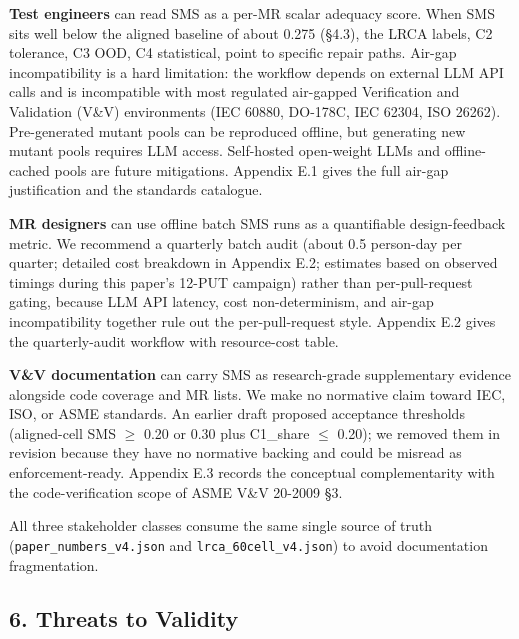 \documentclass[review,12pt,authoryear]{elsarticle}
\begin{document}
\textbf{Test engineers} can read SMS as a per-MR scalar adequacy score.
When SMS sits well below the aligned baseline of about 0.275 (§4.3), the
LRCA labels, C2 tolerance, C3 OOD, C4 statistical, point to specific
repair paths. Air-gap incompatibility is a hard limitation: the workflow
depends on external LLM API calls and is incompatible with most
regulated air-gapped Verification and Validation (V\&V) environments
(IEC 60880, DO-178C, IEC 62304, ISO 26262). Pre-generated mutant pools
can be reproduced offline, but generating new mutant pools requires LLM
access. Self-hosted open-weight LLMs and offline-cached pools are future
mitigations. Appendix E.1 gives the full air-gap justification and the
standards catalogue.

\textbf{MR designers} can use offline batch SMS runs as a quantifiable
design-feedback metric. We recommend a quarterly batch audit (about 0.5
person-day per quarter; detailed cost breakdown in Appendix E.2;
estimates based on observed timings during this paper's 12-PUT campaign)
rather than per-pull-request gating, because LLM API latency, cost
non-determinism, and air-gap incompatibility together rule out the
per-pull-request style. Appendix E.2 gives the quarterly-audit workflow
with resource-cost table.

\textbf{V\&V documentation} can carry SMS as research-grade
supplementary evidence alongside code coverage and MR lists. We make no
normative claim toward IEC, ISO, or ASME standards. An earlier draft
proposed acceptance thresholds (aligned-cell SMS $\geq$ 0.20 or 0.30 plus
C1\_share $\leq$ 0.20); we removed them in revision because they have no
normative backing and could be misread as enforcement-ready. Appendix
E.3 records the conceptual complementarity with the code-verification
scope of ASME V\&V 20-2009 §3.

All three stakeholder classes consume the same single source of truth
(\texttt{paper\_numbers\_v4.json} and \texttt{lrca\_60cell\_v4.json}) to
avoid documentation fragmentation.


\subsection{6. Threats to Validity}\label{threats-to-validity}
\end{document}
